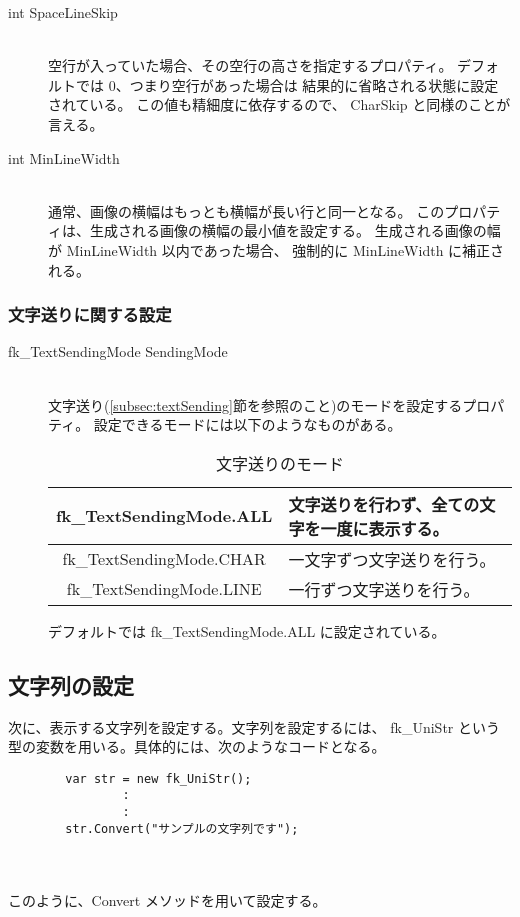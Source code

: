 \begin{description}
\item[int SpaceLineSkip] ~ \\
	空行が入っていた場合、その空行の高さを指定するプロパティ。
	デフォルトでは 0、つまり空行があった場合は
	結果的に省略される状態に設定されている。
	この値も精細度に依存するので、
	CharSkip と同様のことが言える。\\

\item[int MinLineWidth] ~ \\
	通常、画像の横幅はもっとも横幅が長い行と同一となる。
	このプロパティは、生成される画像の横幅の最小値を設定する。
	生成される画像の幅が MinLineWidth 以内であった場合、
	強制的に MinLineWidth に補正される。
\end{description}

\subsubsection{文字送りに関する設定} \label{subsubsec:sendRef}
\begin{description}
\item[fk\_TextSendingMode SendingMode] ~ \\
	文字送り(\ref{subsec:textSending}節を参照のこと)のモードを設定するプロパティ。
	設定できるモードには以下のようなものがある。
		\begin{table}[H]
		\caption{文字送りのモード}
		\label{tbl:textSending}
		\begin{center}
		\begin{tabular}{|c|l|}
		\hline
		fk\_TextSendingMode.ALL &
		文字送りを行わず、全ての文字を一度に表示する。\\ \hline
		fk\_TextSendingMode.CHAR &
		一文字ずつ文字送りを行う。\\ \hline
		fk\_TextSendingMode.LINE &
		一行ずつ文字送りを行う。\\ \hline
		\end{tabular}
		\end{center}
		\end{table}
	デフォルトでは fk\_TextSendingMode.ALL に設定されている。
\end{description}

\subsection{文字列の設定} \label{subsec:strDef}
次に、表示する文字列を設定する。文字列を設定するには、
fk\_UniStr という型の変数を用いる。具体的には、次のようなコードとなる。
\\
\begin{screen}
\begin{verbatim}
        var str = new fk_UniStr();
                :
                :
        str.Convert("サンプルの文字列です");
\end{verbatim}
\end{screen} \\ ~ \\
このように、Convert メソッドを用いて設定する。

